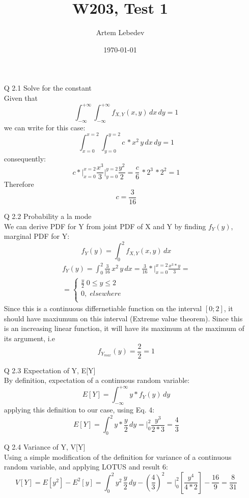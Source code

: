 \documentclass{article}
\author{Artem Lebedev}
\title{W203, Test 1}
\date{\today}
\begin{document}
\maketitle

\begin{enumerate}
\item[Q 2.1] Solve for the constant\\
	Given that
	\begin{equation}
		\int_{-\infty}^{+\infty} \int_{-\infty}^{+\infty}f_{X,Y}(x,y) \,dx\,dy = 1
	\end{equation}
	we can write for this case:
	\begin{equation}
		\int_{x=0}^{x=2} \int_{y=0}^{y=2}c\,*x^2\,y \,dx\,dy = 1
	\end{equation}
	consequently:
	\begin{equation}
		c*\Big|_{x=0}^{x=2} \frac{x^3}{3}\Big|_{y=0}^{y=2}\frac{y^2}{2} = 
		\frac{c}{6}\,*2^3\,*2^2 = 1
	\end{equation}
	Therefore $$c = \frac{3}{16}$$
\item[Q 2.2] Probability a la mode\\
	We can derive PDF for Y from joint PDF of X and Y by finding $f_Y(y)$, marginal PDF for Y:
	\begin{equation}
		f_Y(y) = \int_{0}^{2}f_{X,Y}(x,y)\,dx
	\end{equation}
	\begin{align*}
		f_Y(y) = \int_{0}^{2}\frac{3}{16}\,x^2\,y\,dx=\frac{3}{16}*\Big|_{x=0}^{x=2}\frac{x^3*y}{3}=\\
		= 	\begin{cases}
				\frac{y}{2}\;0\leq y \leq2\\
				0,\; elsewhere\\
			\end{cases}
	\end{align*}
	Since this is a continuous differnetiable function on the interval $[0;2]$, it should have maxiumum on this interval (Extreme value theorem). Since this is an increasing linear function, it will have its maximum at the maximum of its argument, i.e $$f_{Y_{max}}(y) = \frac{2}{2} = 1$$
\item[Q 2.3] Expectation of Y, E[Y]\\
	By definition, expectation of a continuous random variable:
	\begin{equation}
		E[Y] = \int_{-\infty}^{+\infty}y*f_Y(y)\,dy
	\end{equation}
	applying this definition to our case, using Eq. 4:
	\begin{equation}
		E[Y] = \int_{0}^{2}y*\frac{y}{2}\,dy = \Big|_0^2\frac{y^3}{2*3} = \frac{4}{3}
	\end{equation}
\item[Q 2.4] Variance of Y, V[Y]\\
	Using a simple modification of the definition for variance of a continuous random variable, and applying LOTUS and result 6:
	\begin{equation}
		V[Y] = E[y^2]-E^2[y] = \int_{0}^{2}y^2\,\frac{y}{2}\,dy - \left(\frac{4}{3}\right)^2 = \Big|_0^2\left[\frac{y^4}{4*2}\right] - \frac{16}{9} = \frac{8}{31}
	\end{equation}

\end{enumerate}
\end{document}
